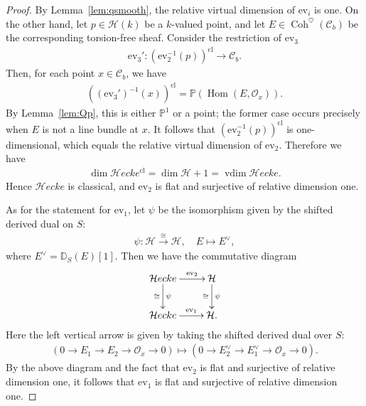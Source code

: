 \documentclass[11pt,oneside,a4paper,mathscr]{amsart}
\theoremstyle{definition}
\newcommand{\cH}{\mathcal{H}}
\newcommand{\cC}{\mathcal{C}}
\newcommand{\ev}{\mathrm{ev}}
\newcommand{\cHecke}{\mathcal{H}ecke}
\newcommand{\Coh}{\operatorname{Coh}}
\newcommand{\Hom}{\operatorname{Hom}}
\begin{document}
\begin{proof}
    By Lemma~\ref{lem:qsmooth}, the relative virtual dimension of $\ev_i$ is one. 
    On the other hand, let $p\in \cH(k)$ be a $k$-valued point, 
    and let $E\in \Coh^{\heartsuit}(\cC_b)$ be the corresponding 
    torsion-free sheaf. Consider the restriction of $\ev_3$
    \begin{align*}
     \ev_3' \colon    (\ev_2^{-1}(p))^{\mathrm{cl}} \to \cC_b. 
    \end{align*}
    Then, for each point $x\in \cC_b$, we have 
    \begin{align*}
        ((\ev_3')^{-1}(x))^{\mathrm{cl}}
        =\mathbb{P}(\Hom(E, \mathcal{O}_x)).
    \end{align*}
    By Lemma~\ref{lem:Qp}, this is either $\mathbb{P}^1$ or a point; 
    the former case occurs precisely when $E$ is not a line bundle at $x$. 
    It follows that $(\ev_2^{-1}(p))^{\mathrm{cl}}$ is one-dimensional, 
    which equals the relative virtual dimension of $\ev_2$. 
    Therefore we have
    \begin{align*}
        \dim \cHecke^{\mathrm{cl}}=\dim \cH+1=\operatorname{vdim}\cHecke.
    \end{align*}
    Hence $\cHecke$ is classical, and $\ev_2$ is flat and surjective of relative dimension one. 

    As for the statement for $\ev_1$, 
    let $\psi$ be the isomorphism given by the shifted derived dual on $S$:
    \begin{align*}
        \psi \colon \cH \stackrel{\cong}{\to} \cH, \quad E \mapsto E^{\vee},
    \end{align*}
    where $E^{\vee}=\mathbb{D}_S(E)[1]$. 
    Then we have the commutative diagram 
    \begin{align}\label{dia:heckedual}
        \xymatrix{
        \cHecke \ar[r]^-{\ev_2} \ar[d]^-{\psi}_-{\cong}  
        & \cH \ar[d]^-{\psi }_-{\cong} \\
        \cHecke  \ar[r]^-{\ev_1} & \cH.
        }
    \end{align}
    Here the left vertical arrow is given by taking the shifted derived dual over $S$:
    \begin{align*}
        (0\to E_1 \to E_2 \to \mathcal{O}_x \to 0) 
        \mapsto 
        (0\to E_2^{\vee} \to E_1^{\vee} \to \mathcal{O}_x \to 0).
    \end{align*}
    By the above diagram and the fact that $\ev_2$ is flat and surjective of relative dimension one, 
    it follows that $\ev_1$ is flat and surjective of relative dimension one. 
\end{proof}
\end{document}
